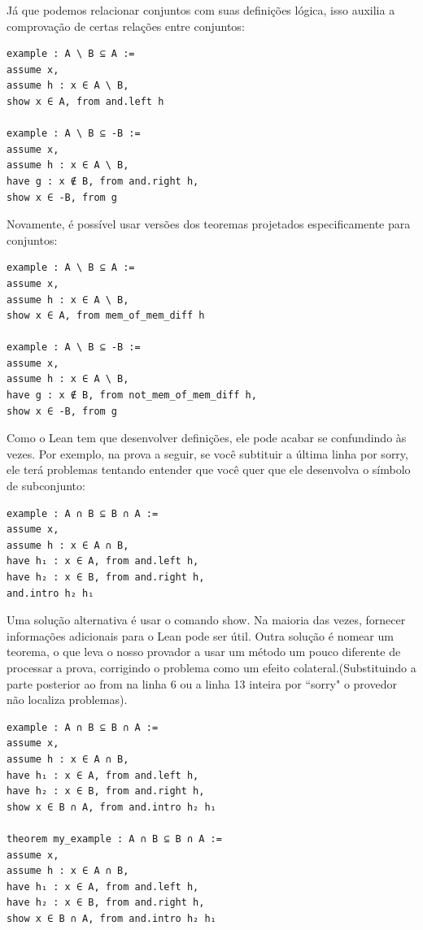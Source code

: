 Já que podemos relacionar conjuntos com suas definições lógica, isso auxilia a comprovação de certas relações entre conjuntos:

\begin{lstlisting}
example : A \ B ⊆ A :=
assume x,
assume h : x ∈ A \ B,
show x ∈ A, from and.left h

example : A \ B ⊆ -B :=
assume x,
assume h : x ∈ A \ B,
have g : x ∉ B, from and.right h,
show x ∈ -B, from g \end{lstlisting}

Novamente, é possível usar versões dos teoremas projetados especificamente para conjuntos:

\begin{lstlisting}
example : A \ B ⊆ A :=
assume x,
assume h : x ∈ A \ B,
show x ∈ A, from mem_of_mem_diff h

example : A \ B ⊆ -B :=
assume x,
assume h : x ∈ A \ B,
have g : x ∉ B, from not_mem_of_mem_diff h,
show x ∈ -B, from g \end{lstlisting}

Como o Lean tem que desenvolver definições, ele pode acabar se confundindo às vezes. Por exemplo, na prova a seguir, se você subtituir a última linha por {\selectfont sorry}, ele terá problemas tentando entender que você quer que ele desenvolva o símbolo de subconjunto:

\begin{lstlisting}
example : A ∩ B ⊆ B ∩ A :=
assume x,
assume h : x ∈ A ∩ B,
have h₁ : x ∈ A, from and.left h,
have h₂ : x ∈ B, from and.right h,
and.intro h₂ h₁ \end{lstlisting}

Uma solução alternativa é usar o comando {\selectfont show}. Na maioria das vezes, fornecer informações adicionais para o Lean pode ser útil. Outra solução é nomear um teorema, o que leva o nosso provador a usar um método um pouco diferente de processar a prova, corrigindo o problema como um efeito colateral.(Substituindo a parte posterior ao {\selectfont from} na linha 6 ou a linha 13 inteira por ``{\selectfont sorry}" o provedor não localiza problemas).

\begin{lstlisting}
example : A ∩ B ⊆ B ∩ A :=
assume x,
assume h : x ∈ A ∩ B,
have h₁ : x ∈ A, from and.left h,
have h₂ : x ∈ B, from and.right h,
show x ∈ B ∩ A, from and.intro h₂ h₁

theorem my_example : A ∩ B ⊆ B ∩ A :=
assume x,
assume h : x ∈ A ∩ B,
have h₁ : x ∈ A, from and.left h,
have h₂ : x ∈ B, from and.right h,
show x ∈ B ∩ A, from and.intro h₂ h₁ \end{lstlisting}

